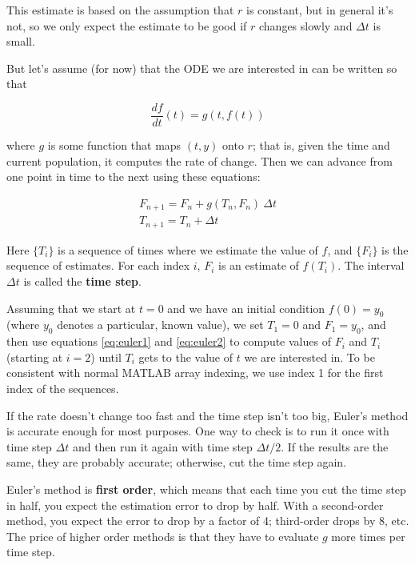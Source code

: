 \documentclass[
]{book}
\begin{document}
This estimate is based on the assumption that $r$ is constant, but
in general it's not, so we only expect the estimate to be good if
$r$ changes slowly and $\Delta t$ is small.

But let's assume (for now) that the ODE we are interested in can
be written so that

\begin{equation}\label{eq:g_ODE}
\frac{df}{dt}(t) = g(t, f(t))
\end{equation}

where $g$ is some function that maps $(t, y)$ onto $r$;
that is, given the time and current population, it computes the rate
of change.  Then we can advance from one point in time to the
next using these equations:

\begin{eqnarray}
\label{eq:euler1}
F_{n+1} = F_n + g(T_n,F_n)~\Delta t           \\
\label{eq:euler2}
T_{n+1} = T_n + \Delta t
\end{eqnarray}

Here $\{T_i\}$ is a sequence of times where we estimate the value
of $f$, and $\{F_i\}$ is the sequence of estimates.  For each
index $i$, $F_i$ is an estimate of $f(T_i)$.
The interval $\Delta t$ is called the {\bf time step}.

Assuming that we start at $t=0$ and we have an initial condition $f(0)
= y_0$ (where $y_0$ denotes a particular, known value), we set
$T_1 = 0$ and $F_1 = y_0$, and then use
equations \eqref{eq:euler1} and \eqref{eq:euler2} to
compute values of $F_i$ and $T_i$ (starting at $i = 2$) until $T_i$
gets to the value of $t$ we are interested in.  To be consistent with 
normal MATLAB array indexing, we use index 1 for the first index of 
the sequences.  

If the rate doesn't change too fast and the time step isn't
too big, Euler's method is accurate enough for most purposes.  One
way to check is to run it once with time step $\Delta t$ and then run it
again with time step $\Delta t/2$.  If the results are the same, they are
probably accurate; otherwise, cut the time step again.

Euler's method is {\bf first order}, which means that each time you
cut the time step in half, you expect the estimation error to drop by
half.  With a second-order method, you expect the error to drop by a
factor of 4; third-order drops by 8, etc.  The price of higher order
methods is that they have to evaluate $g$ more times per time step.
\end{document}
